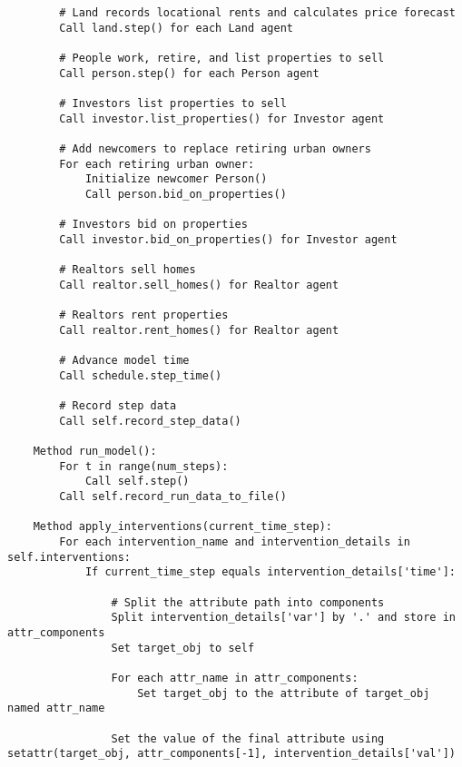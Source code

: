 {\begin{verbatim}
        # Land records locational rents and calculates price forecast
        Call land.step() for each Land agent

        # People work, retire, and list properties to sell
        Call person.step() for each Person agent

        # Investors list properties to sell
        Call investor.list_properties() for Investor agent

        # Add newcomers to replace retiring urban owners
        For each retiring urban owner:
            Initialize newcomer Person()
            Call person.bid_on_properties()

        # Investors bid on properties
        Call investor.bid_on_properties() for Investor agent

        # Realtors sell homes
        Call realtor.sell_homes() for Realtor agent

        # Realtors rent properties
        Call realtor.rent_homes() for Realtor agent

        # Advance model time
        Call schedule.step_time()

        # Record step data
        Call self.record_step_data()

    Method run_model():
        For t in range(num_steps):
            Call self.step()
        Call self.record_run_data_to_file()

    Method apply_interventions(current_time_step):
        For each intervention_name and intervention_details in self.interventions:
            If current_time_step equals intervention_details['time']:
                
                # Split the attribute path into components
                Split intervention_details['var'] by '.' and store in attr_components
                Set target_obj to self
                
                For each attr_name in attr_components:
                    Set target_obj to the attribute of target_obj named attr_name

                Set the value of the final attribute using setattr(target_obj, attr_components[-1], intervention_details['val'])
    
\end{verbatim} }

